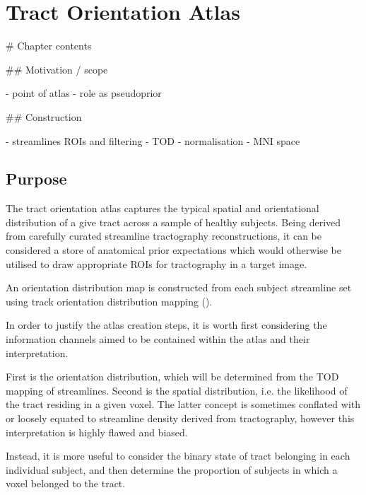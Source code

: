 \chapter{Tract Orientation Atlas}
\label{chapterlabel2}

\begin{markdown}

  # Chapter contents

  ## Motivation / scope

  - point of atlas
  - role as pseudoprior

  ## Construction

  - streamlines ROIs and filtering
  - TOD
  - normalisation
  - MNI space

\end{markdown}

\section{Purpose}

The tract orientation atlas captures the typical spatial and orientational distribution of a give tract across a sample of healthy subjects. Being derived from carefully curated streamline tractography reconstructions, it can be considered a store of anatomical prior expectations which would otherwise be utilised to draw appropriate ROIs for tractography in a target image.


An orientation distribution map is constructed from each subject streamline set using track orientation distribution mapping ().\autocite{Dhollander2014}

In order to justify the atlas creation steps, it is worth first considering the information channels aimed to be contained within the atlas and their interpretation.

First is the orientation distribution, which will be determined from the TOD mapping of streamlines.
Second is the spatial distribution, i.e. the likelihood of the tract residing in a given voxel.
The latter concept is sometimes conflated with or loosely equated to streamline density derived from tractography, however this interpretation is highly flawed and biased.

Instead, it is more useful to consider the binary state of tract belonging in each individual subject, and then determine the proportion of subjects in which a voxel belonged to the tract. 

